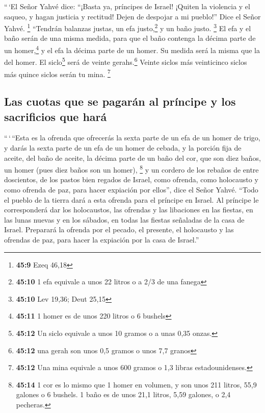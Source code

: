 \begin{paracol}{2}
 ``\,`El Señor Yahvé dice: ``¡Basta ya, príncipes de
Israel! ¡Quiten la violencia y el saqueo, y hagan justicia y rectitud!
Dejen de despojar a mi pueblo!'' Dice el Señor Yahvé. \footnote{\textbf{45:9}
  Ezeq 46,18}  ``Tendrán balanzas justas, un efa
justo,\footnote{\textbf{45:10} 1 efa equivale a unos 22 litros o a 2/3
  de una fanega} y un baño justo. \footnote{\textbf{45:10} Lev 19,36;
  Deut 25,15}  El efa y el baño serán de una misma
medida, para que el baño contenga la décima parte de un
homer,\footnote{\textbf{45:11} 1 homer es de unos 220 litros o 6 bushels}
y el efa la décima parte de un homer. Su medida será la misma que la del
homer.  El siclo\footnote{\textbf{45:12} Un siclo
  equivale a unos 10 gramos o a unas 0,35 onzas.} será de veinte
gerahs.\footnote{\textbf{45:12} una gerah son unos 0,5 gramos o unos 7,7
  granos} Veinte siclos más veinticinco siclos más quince siclos serán
tu mina. \footnote{\textbf{45:12} Una mina equivale a unos 600 gramos o
  1,3 libras estadounidenses.}

\hypertarget{las-cuotas-que-se-pagaruxe1n-al-pruxedncipe-y-los-sacrificios-que-haruxe1}{%
\subsection{Las cuotas que se pagarán al príncipe y los sacrificios que
hará}\label{las-cuotas-que-se-pagaruxe1n-al-pruxedncipe-y-los-sacrificios-que-haruxe1}}

 ``\,`\,``Esta es la ofrenda que ofrecerás la sexta parte
de un efa de un homer de trigo, y darás la sexta parte de un efa de un
homer de cebada,  y la porción fija de aceite, del baño
de aceite, la décima parte de un baño del cor, que son diez baños, un
homer (pues diez baños son un homer), \footnote{\textbf{45:14} 1 cor es
  lo mismo que 1 homer en volumen, y son unos 211 litros, 55,9 galones o
  6 bushels. 1 baño es de unos 21,1 litros, 5,59 galones, o 2,4
  pecheras.}  y un cordero de los rebaños de entre
doscientos, de los pastos bien regados de Israel, como ofrenda, como
holocausto y como ofrenda de paz, para hacer expiación por ellos'', dice
el Señor Yahvé.  ``Todo el pueblo de la tierra dará a
esta ofrenda para el príncipe en Israel.  Al príncipe le
corresponderá dar los holocaustos, las ofrendas y las libaciones en las
fiestas, en las lunas nuevas y en los sábados, en todas las fiestas
señaladas de la casa de Israel. Preparará la ofrenda por el pecado, el
presente, el holocausto y las ofrendas de paz, para hacer la expiación
por la casa de Israel.''


\end{paracol}
